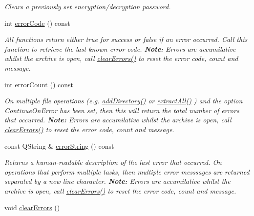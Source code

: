 \begin{DoxyCompactItemize}
\begin{DoxyCompactList}\small\item\em Clears a previously set encryption/decryption password. \end{DoxyCompactList}\item 
int \hyperlink{class_ab_zip_aed3be53eab7d843ca48943247b03d8c4}{error\+Code} () const 
\begin{DoxyCompactList}\small\item\em All functions return either true for success or false if an error occurred. Call this function to retrieve the last known error code. {\bfseries Note\+:} Errors are accumilative whilst the archive is open, call \hyperlink{class_ab_zip_a4e08361f95e0bc46aae1599232674230}{clear\+Errors()} to reset the error code, count and message. \end{DoxyCompactList}\item 
int \hyperlink{class_ab_zip_ae32a8a92d2cc267e2c57705e95fafc05}{error\+Count} () const 
\begin{DoxyCompactList}\small\item\em On multiple file operations (e.\+g. \hyperlink{class_ab_zip_adf2414a410a25ef82ac7349b0a2d1c97}{add\+Directory()} or \hyperlink{class_ab_zip_ac32a9ad3665fea51a0d3977e251ade73}{extract\+All()} ) and the option Continue\+On\+Error has been set, then this will return the total number of errors that occurred. {\bfseries Note\+:} Errors are accumilative whilst the archive is open, call \hyperlink{class_ab_zip_a4e08361f95e0bc46aae1599232674230}{clear\+Errors()} to reset the error code, count and message. \end{DoxyCompactList}\item 
const Q\+String \& \hyperlink{class_ab_zip_a218ae44456c9e7518ad22fb9f8fd7466}{error\+String} () const 
\begin{DoxyCompactList}\small\item\em Returns a human-\/readable description of the last error that occurred. On operations that perform multiple tasks, then multiple error messsages are returned separated by a new line character. {\bfseries Note\+:} Errors are accumilative whilst the archive is open, call \hyperlink{class_ab_zip_a4e08361f95e0bc46aae1599232674230}{clear\+Errors()} to reset the error code, count and message. \end{DoxyCompactList}\item 
void \hyperlink{class_ab_zip_a4e08361f95e0bc46aae1599232674230}{clear\+Errors} ()\hypertarget{class_ab_zip_a4e08361f95e0bc46aae1599232674230}{}\label{class_ab_zip_a4e08361f95e0bc46aae1599232674230}


\end{DoxyCompactItemize}

